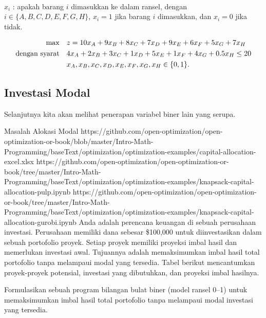 \begin{solution}
 \\
$x_i$ : apakah barang $i$ dimasukkan ke dalam ransel, dengan $i \in \{A, B, C, D, E, F, G, H\}$, $x_i = 1$ jika barang $i$ dimasukkan, dan $x_i = 0$ jika tidak.

\smallskip {}
\begin{align*}
\max \quad & z = 10x_A + 9x_B + 8x_C + 7x_D + 9x_E + 6x_F + 5x_G + 7x_H \\
\mbox{dengan syarat}\quad        & 4x_A + 2x_B + 3x_C + 1x_D + 5x_E + 1x_F + 4x_G + 0.5x_H \le 20 \\
& x_A, x_B, x_C, x_D, x_E, x_F, x_G, x_H \in \{0,1\}.
\end{align*}
\end{solution}

\subsection{Investasi Modal}
Selanjutnya kita akan melihat penerapan variabel biner lain yang serupa.
\begin{examplewithallcode}{Masalah Alokasi Modal}
{https://github.com/open-optimization/open-optimization-or-book/blob/master/Intro-Math-Programming/baseText/optimization/optimization-examples/capital-allocation-excel.xlsx}
{https://github.com/open-optimization/open-optimization-or-book/tree/master/Intro-Math-Programming/baseText/optimization/optimization-examples/knapsack-capital-allocation-pulp.ipynb}
{https://github.com/open-optimization/open-optimization-or-book/tree/master/Intro-Math-Programming/baseText/optimization/optimization-examples/knapsack-capital-allocation-gurobi.ipynb}
Anda adalah perencana keuangan di sebuah perusahaan investasi. Perusahaan memiliki dana sebesar \$100,000 untuk diinvestasikan dalam sebuah portofolio proyek. Setiap proyek memiliki proyeksi imbal hasil dan memerlukan investasi awal. Tujuannya adalah memaksimumkan imbal hasil total portofolio tanpa melampaui modal yang tersedia. Tabel berikut mencantumkan proyek-proyek potensial, investasi yang dibutuhkan, dan proyeksi imbal hasilnya.

Formulasikan sebuah program bilangan bulat biner (model ransel 0--1) untuk memaksimumkan imbal hasil total portofolio tanpa melampaui modal investasi yang tersedia.
\end{examplewithallcode}

